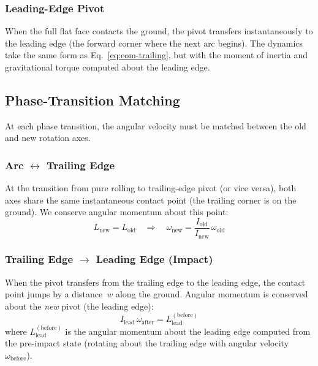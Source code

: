 \documentclass[11pt,a4paper]{article}
\newcommand{\eqn}[1]{Eq.~\eqref{#1}}
\theoremstyle{plain}
\theoremstyle{definition}
\theoremstyle{remark}
\begin{document}
\subsubsection{Leading-Edge Pivot}

When the full flat face contacts the ground, the pivot transfers instantaneously to the leading edge (the forward corner where the next arc begins).  The dynamics take the same form as \eqn{eq:eom-trailing}, but with the moment of inertia and gravitational torque computed about the leading edge.


\subsection{Phase-Transition Matching}
\label{sec:matching}

At each phase transition, the angular velocity must be matched between the old and new rotation axes.

\subsubsection{Arc $\leftrightarrow$ Trailing Edge}

At the transition from pure rolling to trailing-edge pivot (or vice versa), both axes share the same instantaneous contact point (the trailing corner is on the ground).  We conserve angular momentum about this point:
\begin{equation}
    L_{\mathrm{new}} = L_{\mathrm{old}} \quad \Longrightarrow \quad \omega_{\mathrm{new}} = \frac{I_{\mathrm{old}}}{I_{\mathrm{new}}}\,\omega_{\mathrm{old}}
    \label{eq:match-arc-trail}
\end{equation}

\subsubsection{Trailing Edge $\to$ Leading Edge (Impact)}
\label{sec:impact}

When the pivot transfers from the trailing edge to the leading edge, the contact point jumps by a distance~$w$ along the ground.  Angular momentum is conserved about the \emph{new} pivot (the leading edge):
\begin{equation}
    I_{\mathrm{lead}}\,\omega_{\mathrm{after}} = L_{\mathrm{lead}}^{(\mathrm{before})}
    \label{eq:impact-conservation}
\end{equation}
where $L_{\mathrm{lead}}^{(\mathrm{before})}$ is the angular momentum about the leading edge computed from the pre-impact state (rotating about the trailing edge with angular velocity~$\omega_{\mathrm{before}}$).
\end{document}
